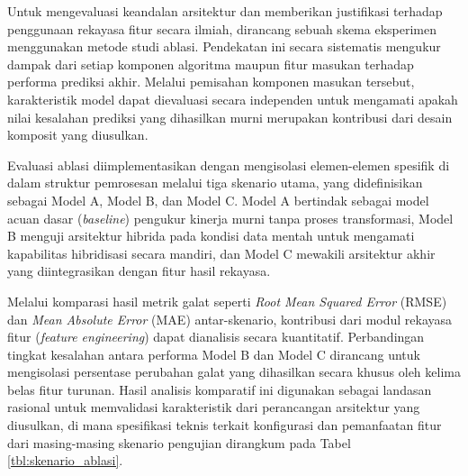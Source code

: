 Untuk mengevaluasi keandalan arsitektur dan memberikan justifikasi terhadap penggunaan rekayasa fitur secara ilmiah, dirancang sebuah skema eksperimen menggunakan metode studi ablasi. Pendekatan ini secara sistematis mengukur dampak dari setiap komponen algoritma maupun fitur masukan terhadap performa prediksi akhir. Melalui pemisahan komponen masukan tersebut, karakteristik model dapat dievaluasi secara independen untuk mengamati apakah nilai kesalahan prediksi yang dihasilkan murni merupakan kontribusi dari desain komposit yang diusulkan.

Evaluasi ablasi diimplementasikan dengan mengisolasi elemen-elemen spesifik di dalam struktur pemrosesan melalui tiga skenario utama, yang didefinisikan sebagai Model A, Model B, dan Model C. Model A bertindak sebagai model acuan dasar (\textit{baseline}) pengukur kinerja murni tanpa proses transformasi, Model B menguji arsitektur hibrida pada kondisi data mentah untuk mengamati kapabilitas hibridisasi secara mandiri, dan Model C mewakili arsitektur akhir yang diintegrasikan dengan fitur hasil rekayasa.

Melalui komparasi hasil metrik galat seperti \textit{Root Mean Squared Error} (RMSE) dan \textit{Mean Absolute Error} (MAE) antar-skenario, kontribusi dari modul rekayasa fitur (\textit{feature engineering}) dapat dianalisis secara kuantitatif. Perbandingan tingkat kesalahan antara performa Model B dan Model C dirancang untuk mengisolasi persentase perubahan galat yang dihasilkan secara khusus oleh kelima belas fitur turunan. Hasil analisis komparatif ini digunakan sebagai landasan rasional untuk memvalidasi karakteristik dari perancangan arsitektur yang diusulkan, di mana spesifikasi teknis terkait konfigurasi dan pemanfaatan fitur dari masing-masing skenario pengujian dirangkum pada Tabel \ref{tbl:skenario_ablasi}.

